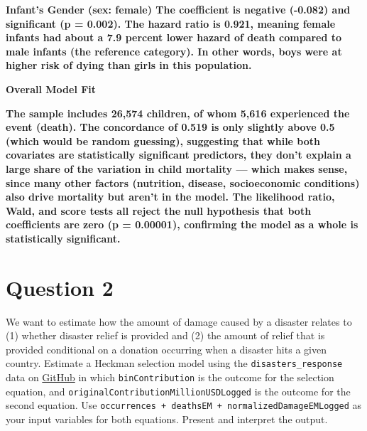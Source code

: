 \documentclass[12pt,letterpaper]{article}
\begin{document}
		\vspace{0.5cm}
		
		\textbf{Infant's Gender (sex: female)
		The coefficient is negative (-0.082) and significant (p = 0.002). The hazard ratio is 0.921, meaning female infants had about a 7.9 percent lower hazard of death compared to male infants (the reference category). In other words, boys were at higher risk of dying than girls in this population.}
	
		\textbf{Overall Model Fit}
	
	\vspace{0.2cm}
	
	\textbf{The sample includes 26,574 children, of whom 5,616 experienced the event (death). The concordance of 0.519 is only slightly above 0.5 (which would be random guessing), suggesting that while both covariates are statistically significant predictors, they don't explain a large share of the variation in child mortality — which makes sense, since many other factors (nutrition, disease, socioeconomic conditions) also drive mortality but aren't in the model. The likelihood ratio, Wald, and score tests all reject the null hypothesis that both coefficients are zero (p = 0.00001), confirming the model as a whole is statistically significant.}
	

\section*{Question 2}
\vspace{.25cm}
\noindent We want to estimate how the amount of damage caused by a disaster relates to (1) whether disaster relief is provided and (2) the amount of relief that is provided  conditional on a donation occurring when a disaster hits a given country. Estimate a Heckman selection model using the \texttt{disasters\_response} data on \href{https://raw.githubusercontent.com/ASDS-TCD/StatsII_2026/refs/heads/main/datasets/disaster_response.csv}{GitHub} in which \texttt{binContribution} is the outcome for the selection equation, and \texttt{originalContributionMillionUSDLogged} is the outcome for the second equation. Use \texttt{occurrences  + deathsEM + normalizedDamageEMLogged} as your input variables for both equations. Present and interpret the output.


	 
	
\vspace{10cm}
	
	
	
\end{document}
